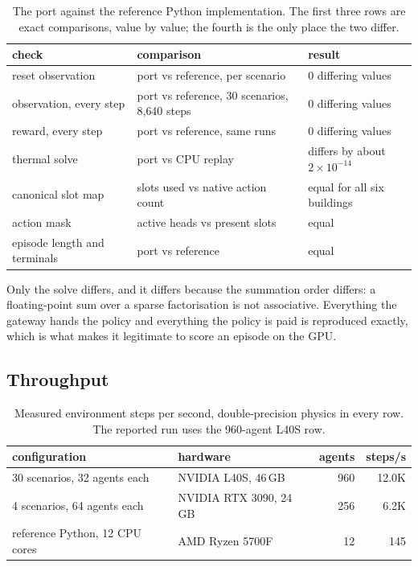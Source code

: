 \documentclass{article}
\begin{document}
\begin{table}[h!]
\centering
\small
\begin{tabular}{@{}lll@{}}
\toprule
check & comparison & result \\
\midrule
reset observation & port vs reference, per scenario & 0 differing values \\
observation, every step & port vs reference, 30 scenarios, 8{,}640 steps & 0 differing values \\
reward, every step & port vs reference, same runs & 0 differing values \\
thermal solve & port vs CPU replay & differs by about $2\times10^{-14}$ \\
canonical slot map & slots used vs native action count & equal for all six buildings \\
action mask & active heads vs present slots & equal \\
episode length and terminals & port vs reference & equal \\
\bottomrule
\end{tabular}
\vspace{4pt}
\caption{The port against the reference Python implementation. The first three rows are exact comparisons, value by value; the fourth is the only place the two differ.}
\label{tab:app_validation}
\end{table}

Only the solve differs, and it differs because the summation order differs: a floating-point sum over a sparse factorisation is not associative. Everything the gateway hands the policy and everything the policy is paid is reproduced exactly, which is what makes it legitimate to score an episode on the GPU.

\subsection{Throughput}
\label{app:throughput}

\begin{table}[h!]
\centering
\small
\begin{tabular}{@{}llrr@{}}
\toprule
configuration & hardware & agents & steps/s \\
\midrule
30 scenarios, 32 agents each & NVIDIA L40S, 46\,GB & 960 & 12.0K \\
4 scenarios, 64 agents each & NVIDIA RTX 3090, 24\,GB & 256 & 6.2K \\
reference Python, 12 CPU cores & AMD Ryzen 5700F & 12 & 145 \\
\bottomrule
\end{tabular}
\vspace{4pt}
\caption{Measured environment steps per second, double-precision physics in every row. The reported run uses the 960-agent L40S row.}
\label{tab:app_throughput}
\end{table}
\end{document}
